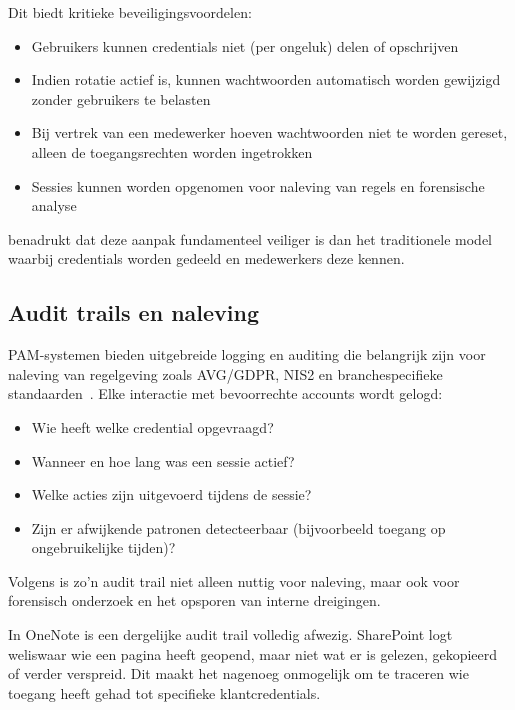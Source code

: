 Dit biedt kritieke beveiligingsvoordelen:
\begin{itemize}
    \item Gebruikers kunnen credentials niet (per ongeluk) delen of opschrijven
    \item Indien rotatie actief is, kunnen wachtwoorden automatisch worden gewijzigd zonder gebruikers te belasten
    \item Bij vertrek van een medewerker hoeven wachtwoorden niet te worden gereset, alleen de toegangsrechten worden ingetrokken
    \item Sessies kunnen worden opgenomen voor naleving van regels en forensische analyse
\end{itemize}

\textcite{sizov2024pam} benadrukt dat deze aanpak fundamenteel veiliger is dan het traditionele model waarbij credentials worden gedeeld en medewerkers deze kennen.

\subsection{Audit trails en naleving}
\label{subsec:pam-audit}

PAM-systemen bieden uitgebreide logging en auditing die belangrijk zijn voor naleving van regelgeving zoals AVG/GDPR, NIS2 en branchespecifieke standaarden~\autocite{souppaya2021pam}.
Elke interactie met bevoorrechte accounts wordt gelogd:

\begin{itemize}
    \item Wie heeft welke credential opgevraagd?
    \item Wanneer en hoe lang was een sessie actief?
    \item Welke acties zijn uitgevoerd tijdens de sessie?
    \item Zijn er afwijkende patronen detecteerbaar (bijvoorbeeld toegang op ongebruikelijke tijden)?
\end{itemize}

Volgens \textcite[pp.~597--623]{blobel2006privilege} is zo'n audit trail niet alleen nuttig voor naleving, maar ook voor forensisch onderzoek en het opsporen van interne dreigingen.

In OneNote is een dergelijke audit trail volledig afwezig. SharePoint logt weliswaar wie een pagina heeft geopend, maar niet wat er is gelezen, gekopieerd of verder verspreid. 
Dit maakt het nagenoeg onmogelijk om te traceren wie toegang heeft gehad tot specifieke klantcredentials.

